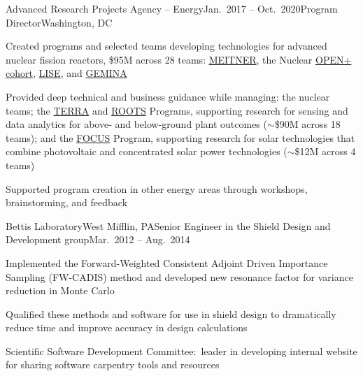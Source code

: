 \begin{rSubsection}{Advanced Research Projects Agency -- Energy}{Jan.\ 2017 -- Oct.\ 2020}{Program Director}{Washington, DC}
\item Created programs and selected teams developing technologies for advanced nuclear fission reactors, \$95M across 28 teams: 
\href{https://arpa-e.energy.gov/?q=arpa-e-programs/meitner}{MEITNER}, the
Nuclear
\href{https://arpa-e.energy.gov/?q=news-item/arpa-e-announces-12-million-five-projects-nuclear-materials-science}{OPEN+
cohort},
\href{https://arpa-e.energy.gov/?q=news-item/arpa-e-innovating-through-unconventional-ideas}{LISE}, and  \href{https://arpa-e.energy.gov/technologies/programs/gemina}{GEMINA}
\item Provided deep technical and business guidance while managing: the nuclear teams; the \href{https://arpa-e.energy.gov/?q=arpa-e-programs/terra}{TERRA} and \href{https://arpa-e.energy.gov/?q=arpa-e-programs/roots}{ROOTS} Programs, supporting research for sensing and data analytics for above- and below-ground plant outcomes ($\sim$\$90M across 18 teams); and the \href{https://arpa-e.energy.gov/?q=arpa-e-programs/focus}{FOCUS} Program, supporting research for solar technologies that combine photovoltaic and concentrated solar power technologies ($\sim$\$12M across 4 teams)
\item Supported program creation in other energy areas through workshops, brainstorming, and feedback  
\end{rSubsection}



\begin{rSubsection}{Bettis Laboratory}{West Mifflin, PA}{Senior Engineer in the Shield Design and Development group}{Mar.\ 2012 -- Aug.\ 2014}
\item Implemented the Forward-Weighted Consistent Adjoint Driven Importance Sampling (FW-CADIS) method and developed new resonance factor for variance reduction in Monte Carlo
\item Qualified these methods and software for use in shield design to dramatically reduce time and improve accuracy in design calculations
\item Scientific Software Development Committee:\ leader in developing internal website for sharing software carpentry tools and resources
\end{rSubsection}

